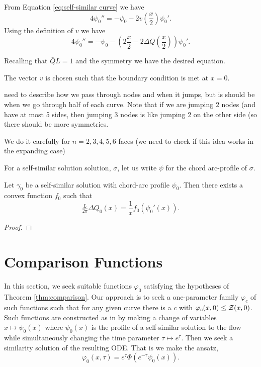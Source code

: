 \documentclass[12pt]{amsart}
\begin{document}
From Equation \eqref{eq:self-similar curve} we have
$$4\psi_0''=-\psi_0-2v\left(\frac{x}{2}\right) \psi_0'. $$
Using the definition of $v$ we have
$$4\psi_0''=-\psi_0-\left(2\frac{x}{2}-2\Delta Q(\frac{x}{2})\right) \psi_0'. $$

Recalling that $\bar{Q}{L}=1$ and the symmetry we have the desired equation. 


The vector $v$ is chosen such that the boundary condition is met at $x=0$.

{\color{red} need to describe how we pass through nodes and when it jumps, but is should be when we go through half of each curve. Note that if we are jumping 2 nodes (and have at most 5 sides, then jumping 3 nodes is like jumping 2 on the other side (so there should be more symmetries. }

We do it carefully for $n=2,3,4,5, 6$ faces (we need to check if this idea works in the expanding case)

For a self-similar solution solution, \(\sigma\), let us write \(\psi\) for the chord arc-profile of \(\sigma\).

\begin{lemma}
Let \(\gamma_0\) be a self-similar solution with chord-arc profile $\psi_0$. Then there exists a convex function $f_0$ such that
\[
\tfrac{L}{2\pi} \Delta Q_0 (x) = \frac{1}{x} f_0(\psi_0'(x)).
\]
\end{lemma}

\begin{proof}

\end{proof}

\section{Comparison Functions}
\label{sec:orgheadline11}

In this section, we seek suitable functions $\varphi_0$ satisfying the hypotheses of Theorem \ref{thm:comparison}. Our approach is to seek a one-parameter family $\varphi_c$ of such functions such that for any given curve there is a $c$ with $\varphi_c(x, 0) \leq \operatorname{\mathcal{Z}}(x, 0)$. Such functions are constructed as in \cite{MR2794630} by making a change of variables $x \mapsto \psi_0(x)$ where $\psi_0(x)$ is the profile of a self-similar solution to the flow while simultaneously changing the time parameter $\tau \mapsto e^{\tau}$. Then we seek a similarity solution of the resulting ODE. That is we make the ansatz,
\[
\varphi_0(x, \tau) = e^{\tau} \Phi(e^{-\tau} \psi_0(x)).
\]
\end{document}
